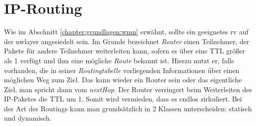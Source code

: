 
%
\section{IP-Routing}
\label{chapter:grundlagen:routing}

Wie im Abschnitt \ref{chapter:grundlagen:wmn} erwähnt, sollte ein geeignetes \acrlong{rv} auf der \gls{nwlayer} angesiedelt sein. Im Grunde bezeichnet \textit{Router}  einen Teilnehmer, der Pakete für andere Teilnehmer weiterleiten kann, sofern es über eine TTL größer als 1 verfügt und ihm eine mögliche \textit{Route} bekannt ist. Hierzu nutzt er, falls vorhanden, die in seiner \textit{Routingtabelle} vorliegenden Informationen über einen möglichen Weg zum Ziel. Das kann wieder ein Router sein oder das eigentliche Ziel, man spricht dann vom \textit{nextHop}. Der Router verringert beim Weiterleiten des IP-Paketes die TTL um 1. Somit wird vermieden, dass es endlos zirkuliert. Bei der Art des Routings kann man grundsätzlich in 2 Klassen unterscheiden: statisch und dynamisch.



